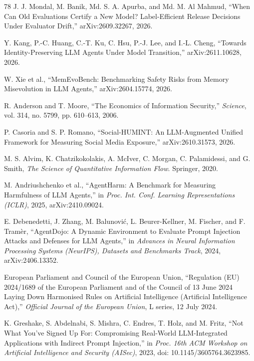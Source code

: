 \begin{thebibliography}{78}
J. J. Mondal, M. Banik, Md. S. A. Apurba, and Md. M. Al Mahmud, ``When Can Old
Evaluations Certify a New Model? Label-Efficient Release Decisions Under
Evaluator Drift,'' arXiv:2609.32267, 2026.

Y. Kang, P.-C. Huang, C.-T. Ku, C. Hsu, P.-J. Lee, and I.-L. Cheng, ``Towards
Identity-Preserving LLM Agents Under Model Transition,'' arXiv:2611.10628,
2026.

W. Xie et al., ``MemEvoBench: Benchmarking Safety Risks from Memory
Misevolution in LLM Agents,'' arXiv:2604.15774, 2026.

R. Anderson and T. Moore, ``The Economics of Information Security,'' \emph{Science},
vol. 314, no. 5799, pp. 610--613, 2006.

P. Casoria and S. P. Romano, ``Social-HUMINT: An LLM-Augmented Unified
Framework for Measuring Social Media Exposure,'' arXiv:2610.31573, 2026.

M. S. Alvim, K. Chatzikokolakis, A. McIver, C. Morgan, C. Palamidessi, and
G. Smith, \emph{The Science of Quantitative Information Flow}. Springer, 2020.

M. Andriushchenko et al., ``AgentHarm: A Benchmark for Measuring Harmfulness
of LLM Agents,'' in \emph{Proc. Int. Conf. Learning Representations (ICLR)},
2025, arXiv:2410.09024.

E. Debenedetti, J. Zhang, M. Balunovi{\'c}, L. Beurer-Kellner, M. Fischer,
and F. Tram{\`e}r, ``AgentDojo: A Dynamic Environment to Evaluate Prompt
Injection Attacks and Defenses for LLM Agents,'' in \emph{Advances in Neural
Information Processing Systems (NeurIPS), Datasets and Benchmarks Track},
2024, arXiv:2406.13352.

European Parliament and Council of the European Union, ``Regulation (EU)
2024/1689 of the European Parliament and of the Council of 13 June 2024
Laying Down Harmonised Rules on Artificial Intelligence (Artificial
Intelligence Act),'' \emph{Official Journal of the European Union}, L series,
12 July 2024.

K. Greshake, S. Abdelnabi, S. Mishra, C. Endres, T. Holz, and M. Fritz, ``Not
What You've Signed Up For: Compromising Real-World LLM-Integrated
Applications with Indirect Prompt Injection,'' in \emph{Proc. 16th ACM
Workshop on Artificial Intelligence and Security (AISec)}, 2023, doi:
10.1145/3605764.3623985.


\end{thebibliography}
